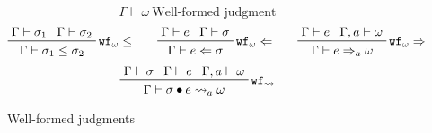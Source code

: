 \documentclass[letterpaper]{article}
\begin{document}
\begin{figure}
  $$ \boxed{\Gamma\vdash\omega}\ \textrm{Well-formed judgment} $$
  $$ \prftree[r]{$\mathtt{wf_\omega \leq}$}
             {\prfassumption{\Gamma\vdash\sigma_1}}{\prfassumption{\Gamma\vdash\sigma_2}}
             {\Gamma\vdash\sigma_1\leq\sigma_2}\qquad
     \prftree[r]{$\mathtt{wf_\omega\Leftarrow}$}
             {\prfassumption{\Gamma\vdash e}}{\prfassumption{\Gamma\vdash\sigma}}
             {\Gamma\vdash e\Leftarrow\sigma}\qquad
     \prftree[r]{$\mathtt{wf_\omega\Rightarrow}$}
             {\prfassumption{\Gamma\vdash e}}{\prfassumption{\Gamma,a\vdash\omega}}
             {\Gamma\vdash e\Rightarrow_a\omega} $$
  $$ \prftree[r]{$\mathtt{wf_\rightsquigarrow}$}
             {\prfassumption{\Gamma\vdash\sigma}}{\prfassumption{\Gamma\vdash e}}
             {\prfassumption{\Gamma,a\vdash\omega}}
             {\Gamma\vdash\sigma\bullet e\rightsquigarrow_a\omega} $$
  \caption{Well-formed judgments}
  \label{f:wf:judgments}
\end{figure}
\end{document}
